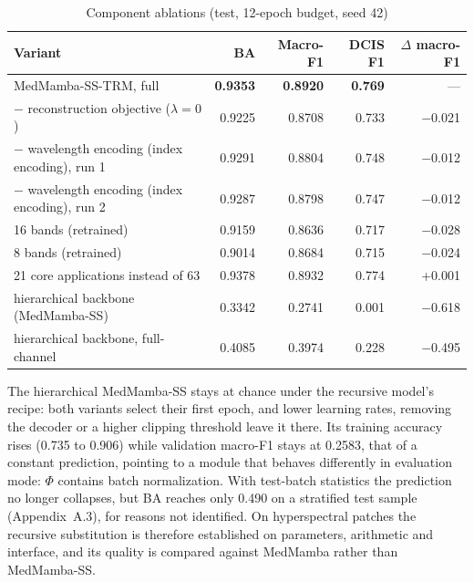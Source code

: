 \documentclass{svproc}
\begin{document}
\begin{table}[t]
\caption{Component ablations (test, 12-epoch budget, seed 42)}
\label{tab:ablation}
\centering\scriptsize
\setlength{\tabcolsep}{4pt}
\begin{tabular}{@{}lrrrr@{}}
\toprule
Variant & BA & Macro-F1 & DCIS F1 & $\Delta$ macro-F1 \\
\midrule
MedMamba-SS-TRM, full & \textbf{0.9353} & \textbf{0.8920} & \textbf{0.769} & --- \\
$-$ reconstruction objective ($\lambda = 0$) & 0.9225 & 0.8708 & 0.733 & $-$0.021 \\
$-$ wavelength encoding (index encoding), run 1 & 0.9291 & 0.8804 & 0.748 & $-$0.012 \\
$-$ wavelength encoding (index encoding), run 2 & 0.9287 & 0.8798 & 0.747 & $-$0.012 \\
16 bands (retrained) & 0.9159 & 0.8636 & 0.717 & $-$0.028 \\
8 bands (retrained) & 0.9014 & 0.8684 & 0.715 & $-$0.024 \\
21 core applications instead of 63 & 0.9378 & 0.8932 & 0.774 & +0.001 \\
hierarchical backbone (MedMamba-SS) & 0.3342 & 0.2741 & 0.001 & $-$0.618 \\
hierarchical backbone, full-channel & 0.4085 & 0.3974 & 0.228 & $-$0.495 \\
\bottomrule
\end{tabular}
\end{table}

The hierarchical MedMamba-SS stays at chance under the recursive model's recipe: both variants select their first epoch, and lower learning rates, removing the decoder or a higher clipping threshold leave it there. Its training accuracy rises (0.735 to 0.906) while validation macro-F1 stays at 0.2583, that of a constant prediction, pointing to a module that behaves differently in evaluation mode: $\Phi$ contains batch normalization. With test-batch statistics the prediction no longer collapses, but BA reaches only 0.490 on a stratified test sample (Appendix~A.3), for reasons not identified. On hyperspectral patches the recursive substitution is therefore established on parameters, arithmetic and interface, and its quality is compared against MedMamba rather than MedMamba-SS.
\end{document}
